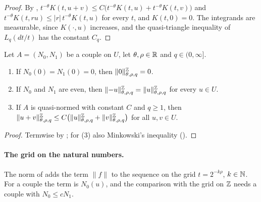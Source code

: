 \begin{proof}
\leanok
By , $t^{-\theta} K(t, u + v) \leq C \bigl(t^{-\theta} K(t, u) +
t^{-\theta} K(t, v)\bigr)$ and $t^{-\theta} K(t, r u) \leq |r| \, t^{-\theta} K(t, u)$ for
every $t$, and $K(t, 0) = 0$. The integrands are measurable, since $K(\cdot, u)$ increases, and
the quasi-triangle inequality of $L_q(dt/t)$ has the constant $C_q$.
\end{proof}

\begin{lemma}
\label{lem:discrete-k-norm-quasi-norm}
\leanok
{}
Let $A = (N_0, N_1)$ be a couple on $U$, let $\theta, \rho \in \mathbb{R}$ and $q \in (0, \infty]$.
\begin{enumerate}
  \item If $N_0(0) = N_1(0) = 0$, then $\|0\|^{\mathbb{Z}}_{\theta, \rho, q} = 0$.
  \item If $N_0$ and $N_1$ are even, then $\|{-u}\|^{\mathbb{Z}}_{\theta, \rho, q} =
    \|u\|^{\mathbb{Z}}_{\theta, \rho, q}$ for every $u \in U$.
  \item If $A$ is quasi-normed with constant $C$ and $q \geq 1$, then
    $\|u + v\|^{\mathbb{Z}}_{\theta, \rho, q} \leq C \bigl(\|u\|^{\mathbb{Z}}_{\theta, \rho, q} +
    \|v\|^{\mathbb{Z}}_{\theta, \rho, q}\bigr)$ for all $u, v \in U$.
\end{enumerate}
\end{lemma}

\begin{proof}
\leanok
Termwise by ; for (3) also Minkowski's inequality
().
\end{proof}

\paragraph{The grid on the natural numbers.}
The norm of  adds the term $\|f\|$ to the sequence on the grid
$t = 2^{-k\rho}$, $k \in \mathbb{N}$. For a couple the term is $N_0(u)$, and the comparison with the grid
on $\mathbb{Z}$ needs a couple with $N_0 \leq c N_1$.


